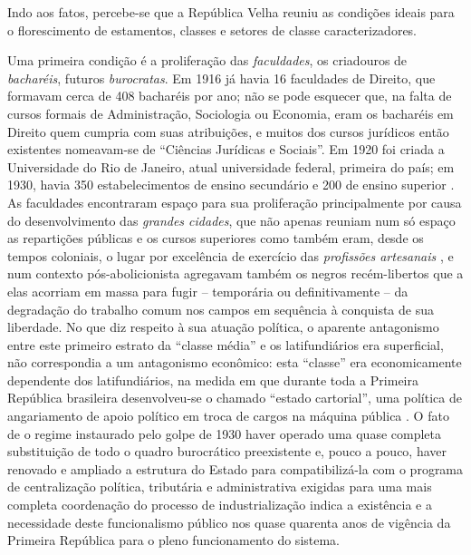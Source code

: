 Indo aos fatos, percebe-se que a República Velha reuniu as condições ideais para o florescimento de estamentos, classes e setores de classe caracterizadores. 

Uma primeira condição é a proliferação das \textit{faculdades}, os criadouros de \textit{bacharéis}, futuros \textit{burocratas}. Em 1916 já havia 16 faculdades de Direito, que formavam cerca de 408 bacharéis por ano; não se pode esquecer que, na falta de cursos formais de Administração, Sociologia ou Economia, eram os bacharéis em Direito quem cumpria com suas atribuições, e muitos dos cursos jurídicos então existentes nomeavam-se de ``Ciências Jurídicas e Sociais''. Em 1920 foi criada a Universidade do Rio de Janeiro, atual universidade federal, primeira do país; em 1930, havia 350 estabelecimentos de ensino secundário e 200 de ensino superior \cite[p.~17]{pinheiro_clamed_1977}. As faculdades encontraram espaço para sua proliferação principalmente por causa do desenvolvimento das \textit{grandes cidades}, que não apenas reuniam num só espaço as repartições públicas e os cursos superiores como também eram, desde os tempos coloniais, o lugar por excelência de exercício das \textit{profissões artesanais} \cite{REIS2012}, e num contexto pós-abolicionista agregavam também os negros recém-libertos que a elas acorriam em massa para fugir -- temporária ou definitivamente -- da degradação do trabalho comum nos campos em sequência à conquista de sua liberdade\cite{AZEVEDO2004, bacelar_negrosalvador_1994}. No que diz respeito à sua atuação política, o aparente antagonismo entre este primeiro estrato da ``classe média'' e os latifundiários era superficial, não correspondia a um antagonismo econômico: esta ``classe'' era economicamente dependente dos latifundiários, na medida em que durante toda a Primeira República brasileira desenvolveu-se o chamado ``estado cartorial'', uma política de angariamento de apoio político em troca de cargos na máquina pública \cite[p.~20]{pinheiro_clamed_1977}. O fato de o regime instaurado pelo golpe de 1930 haver operado uma quase completa substituição de todo o quadro burocrático preexistente e, pouco a pouco, haver renovado e ampliado a estrutura do Estado para compatibilizá-la com o programa de centralização política, tributária e administrativa exigidas para uma mais completa coordenação do processo de industrialização \cite{araujo_dasp_2017} indica a existência e a necessidade deste funcionalismo público nos quase quarenta anos de vigência da Primeira República para o pleno funcionamento do sistema.

